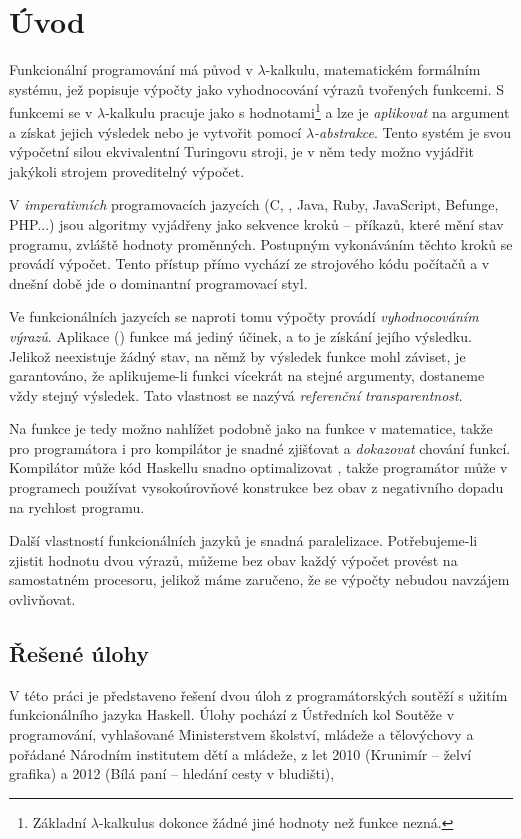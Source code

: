 \chapter{Úvod}

Funkcionální programování má původ v $\lambda$-kalkulu, matematickém formálním
systému, jež popisuje výpočty jako vyhodnocování výrazů tvořených funkcemi.  S
funkcemi se v $\lambda$-kalkulu pracuje jako s hodnotami\footnote{Základní
$\lambda$-kalkulus dokonce žádné jiné hodnoty než funkce nezná.} a lze je
\emph{aplikovat} na argument a získat jejich výsledek nebo je vytvořit pomocí
\emph{$\lambda$-abstrakce}. Tento systém je svou výpočetní silou ekvivalentní
Turingovu stroji, je v něm tedy možno vyjádřit jakýkoli strojem proveditelný
výpočet.

V \emph{imperativních} programovacích jazycích (C, \Cplusplus{}, Java, Ruby,
JavaScript, Befunge, PHP...) jsou algoritmy vyjádřeny jako sekvence kroků --
příkazů, které mění stav programu, zvláště hodnoty proměnných. Postupným
vykonáváním těchto kroků se provádí výpočet. Tento přístup přímo vychází ze
strojového kódu počítačů a v dnešní době jde o dominantní programovací styl.

Ve funkcionálních jazycích se naproti tomu výpočty provádí \emph{vyhodnocováním
výrazů}. Aplikace () funkce má jediný účinek, a to je získání
jejího výsledku. Jelikož neexistuje žádný stav, na němž by výsledek funkce mohl
záviset, je garantováno, že aplikujeme-li funkci vícekrát na stejné argumenty,
dostaneme vždy stejný výsledek. Tato vlastnost se nazývá \emph{referenční
transparentnost}.

Na funkce je tedy možno nahlížet podobně jako na funkce v matematice, takže pro
programátora i pro kompilátor je snadné zjišťovat a \emph{dokazovat} chování
funkcí. Kompilátor může kód Haskellu snadno optimalizovat
\cite{santos1995compilation}, takže programátor může v programech používat
vysokoúrovňové konstrukce bez obav z negativního dopadu na rychlost programu.

Další vlastností funkcionálních jazyků je snadná paralelizace. Potřebujeme-li
zjistit hodnotu dvou výrazů, můžeme bez obav každý výpočet provést na
samostatném procesoru, jelikož máme zaručeno, že se výpočty nebudou navzájem
ovlivňovat.

\section{Řešené úlohy}

V této práci je představeno řešení dvou úloh z programátorských soutěží s užitím
funkcionálního jazyka Haskell. Úlohy pochází z Ústředních kol Soutěže v
programování, vyhlašované Ministerstvem školství, mládeže a tělovýchovy a
pořádané Národním institutem dětí a mládeže, z let 2010 (Krunimír -- želví
grafika) a 2012 (Bílá paní -- hledání cesty v bludišti),

